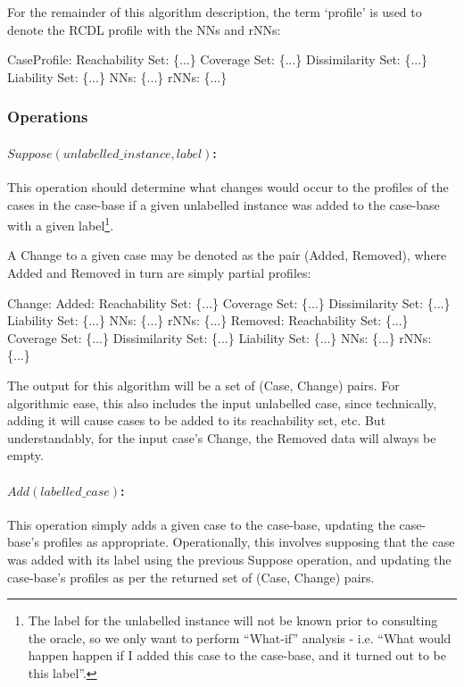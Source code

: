 \documentclass[a4paper,11pt]{report}
\begin{document}
\begin{samepage}
For the remainder of this algorithm description, the term `profile' is used to denote the RCDL profile with the NNs and rNNs:
\nopagebreak[4]
\begin{code}[numbers=none,frame=none]
CaseProfile:  
  Reachability Set:  \{...\}
  Coverage Set:      \{...\}
  Dissimilarity Set: \{...\}
  Liability Set:     \{...\}
  NNs:               \{...\}
  rNNs:              \{...\}
\end{code}
\end{samepage}
\subsubsection{Operations\label{sec:incralgstructops}}
\paragraph{$Suppose(unlabelled\_instance, label)$:}
This operation should determine what changes would occur to the profiles of the cases in the case-base if a given unlabelled instance was added to the case-base with a given label\footnote{The label for the unlabelled instance will not be known prior to consulting the oracle, so we only want to perform ``What-if'' analysis - i.e. ``What would happen happen if I added this case to the case-base, and it turned out to be this label''.}.

A Change to a given case may be denoted as the pair (Added, Removed), where Added and Removed in turn are simply partial profiles:
\begin{code}[numbers=none,frame=none]
Change:
  Added:
    Reachability Set:  \{...\}
    Coverage Set:      \{...\}
    Dissimilarity Set: \{...\}
    Liability Set:     \{...\}
    NNs:               \{...\}
    rNNs:              \{...\}
  Removed:
    Reachability Set:  \{...\}
    Coverage Set:      \{...\}
    Dissimilarity Set: \{...\}
    Liability Set:     \{...\}
    NNs:               \{...\}
    rNNs:              \{...\}
\end{code}

The output for this algorithm will be a set of (Case, Change) pairs. For algorithmic ease, this also includes the input unlabelled case, since technically, adding it will cause cases to be added to its reachability set, etc. But understandably, for the input case's Change, the Removed data will always be empty.

\paragraph{$Add(labelled\_case)$:}
This operation simply adds a given case to the case-base, updating the case-base's profiles as appropriate. Operationally, this involves supposing that the case was added with its label using the previous Suppose operation, and updating the case-base's profiles as per the returned set of (Case, Change) pairs.
\end{document}
